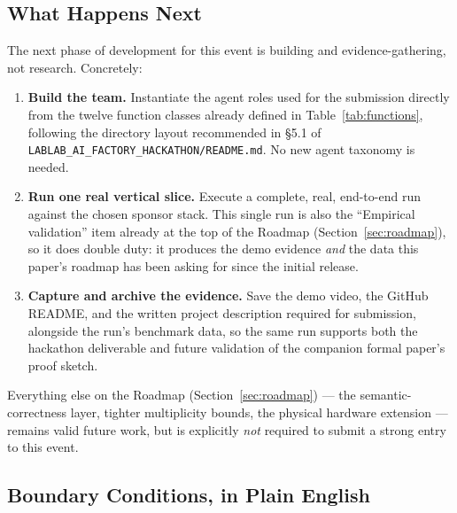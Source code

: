 \documentclass[12pt]{article}
\newcommand{\code}[1]{\texttt{#1}}
\newcommand{\LabLabFactoryReadme}{\code{LABLAB\_AI\_\allowbreak FACTORY\_\allowbreak HACKATHON/\allowbreak README.md}}
\begin{document}
\subsection{What Happens Next}

The next phase of development for this event is building and
evidence-gathering, not research.  Concretely:

\begin{enumerate}
    \item \textbf{Build the team.}  Instantiate the agent roles used
          for the submission directly from the twelve function classes
          already defined in Table~\ref{tab:functions}, following the
          directory layout recommended in \S5.1 of
          \LabLabFactoryReadme{}.  No new agent taxonomy is needed.
    \item \textbf{Run one real vertical slice.}  Execute a complete,
          real, end-to-end run against the chosen sponsor stack.  This
          single run is also the ``Empirical validation'' item already
          at the top of the Roadmap (Section~\ref{sec:roadmap}), so it
          does double duty: it produces the demo evidence \emph{and}
          the data this paper's roadmap has been asking for since the
          initial release.
    \item \textbf{Capture and archive the evidence.}  Save the demo
          video, the GitHub README, and the written project
          description required for submission, alongside the run's
          benchmark data, so the same run supports both the hackathon
          deliverable and future validation of the companion formal
          paper's proof sketch.
\end{enumerate}

Everything else on the Roadmap (Section~\ref{sec:roadmap}) --- the
semantic-correctness layer, tighter multiplicity bounds, the physical
hardware extension --- remains valid future work, but is explicitly
\emph{not} required to submit a strong entry to this event.

\subsection{Boundary Conditions, in Plain English}
\end{document}
